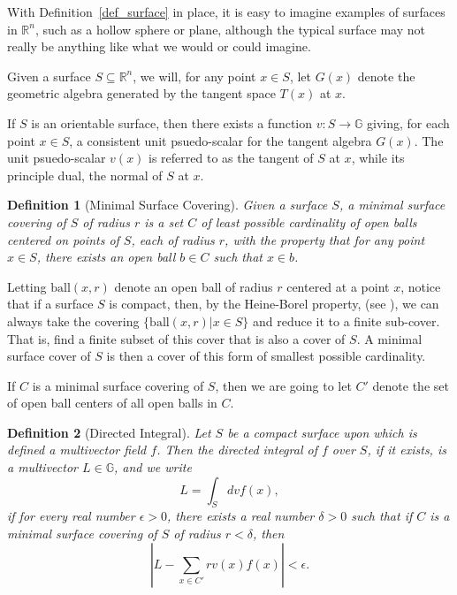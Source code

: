 \documentclass[12pt]{article}
\numberwithin{equation}{section}
\newcommand{\G}{\mathbb{G}}
\newcommand{\R}{\mathbb{R}}
\newtheorem{definition}{Definition}[section]
\begin{document}


With Definition~\ref{def_surface} in place, it is easy to imagine examples of surfaces in $\R^n$,
such as a hollow sphere or plane,
although the typical surface may not really be anything like what we would or could imagine.

Given a surface $S\subseteq\R^n$, we will, for any point $x\in S$, let $G(x)$ denote the geometric
algebra generated by the tangent space $T(x)$ at $x$.

If $S$ is an orientable surface, then there exists a function $v:S\to\G$ giving, for
each point $x\in S$, a consistent unit psuedo-scalar for the tangent algebra $G(x)$.
The unit psuedo-scalar $v(x)$ is referred to as the tangent of $S$ at $x$, while its
principle dual, the normal of $S$ at $x$.

\begin{definition}[Minimal Surface Covering]\label{def_surface_covering}
Given a surface $S$, a minimal surface covering of $S$ of radius $r$ is a set $C$ of least
possible cardinality of open
balls centered on points of $S$, each of radius $r$, with the property that for any point
$x\in S$, there exists an open ball $b\in C$ such that $x\in b$.
\end{definition}

Letting $\mbox{ball}(x,r)$ denote an open ball of radius $r$
centered at a point $x$, notice that if a surface $S$ is compact, then, by the Heine-Borel property,
(see \cite{}), we can always take the covering $\{\mbox{ball}(x,r)|x\in S\}$ and
reduce it to a finite sub-cover.  That is, find a finite subset of this cover that is
also a cover of $S$.  A minimal surface cover of $S$ is then a cover of this form
of smallest possible cardinality.

If $C$ is a minimal surface covering of $S$, then we are going to let $C'$ denote
the set of open ball centers of all open balls in $C$.

\begin{definition}[Directed Integral]\label{def_directed_integral}
Let $S$ be a compact surface upon which is defined a multivector field $f$.
Then the directed integral of $f$ over $S$, if it exists, is a multivector $L\in\G$, and we write
\begin{equation*}
L = \int_S dv f(x),
\end{equation*}
if for every real number $\epsilon>0$, there exists a real number $\delta>0$ such
that if $C$ is a minimal surface covering of $S$ of radius $r<\delta$, then
\begin{equation*}
\left|L - \sum_{x\in C'} r v(x)f(x)\right|<\epsilon.
\end{equation*}
\end{definition}
\end{document}
